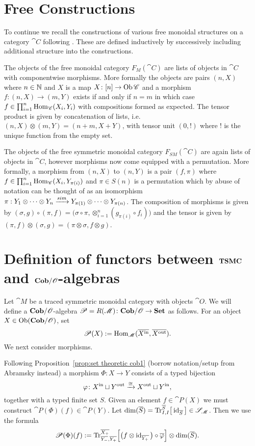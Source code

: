 \section{Free Constructions}

To continue we recall the constructions of various free monoidal structures on a category $\cat{C}$ following \cite{abramsky}.  These are defined inductively by successively including additional structure into the constructions.

The objects of the free monoidal category $F_M(\cat{C})$ are lists of objects in $\cat{C}$ with componentwise morphisms.  More formally the objects are pairs $(n,X)$ where $n\in\mathbb{N}$ and $X$ is a map $X\colon[n]\to \operatorname{Ob}\mathscr{C}$ and a morphism $f:(n,X)\to(m,Y)$ exists if and only if $n=m$ in which case $f\in\prod_{i=1}^n\operatorname{Hom}_{\mathscr{C}}(X_i,Y_i)$ with compositions formed as expected.  The tensor product is given by concatenation of lists, i.e. $(n,X)\otimes(m,Y)=(n+m,X+Y)$, with tensor unit $(0,!)$ where $!$ is the unique function from the empty set.

The objects of the free symmetric monoidal category $F_{SM}(\cat{C})$ are again lists of objects in $\cat{C}$, however morphisms now come equipped with a permutation.  More formally, a morphism from $(n,X)$ to $(n,Y)$ is a pair $(f,\pi)$ where $f\in\prod_{i=1}^n\operatorname{Hom}_{\mathscr{C}}(X_i,Y_{\pi(i)})$ and $\pi\in S(n)$ is a permutation which by abuse of notation can be thought of as an isomorphism $\pi:Y_1\otimes\cdots\otimes Y_n\xrightarrow{sim} Y_{\pi(1)}\otimes\cdots\otimes Y_{\pi(n)}$.  The composition of morphisms is given by $(\sigma,g)\circ(\pi,f)=\Big(\sigma\circ\pi,\otimes_{i=1}^n (g_{\pi(i)}\circ f_i)\Big)$ and the tensor is given by $(\pi,f)\otimes(\sigma,g)=(\pi\otimes\sigma,f\otimes g)$.  


\section{Definition of functors between $\mathbf{TSMC}$ and $\mathbf{Cob}/\mathscr{O}$-algebras}

Let $\cat{M}$ be a traced symmetric monoidal category with objects $\cat{O}$. We will define a $\mathbf{Cob}/\mathscr{O}$-algebra $\mathscr{P}=R(\mathscr{M})\colon\mathbf{Cob}/\mathscr{O}\to\mathbf{Set}$ as follows. For an object $X\in\operatorname{Ob}(\mathbf{Cob}/\mathscr{O})$, set 
$$\mathscr{P}(X):=\operatorname{Hom}_{\mathscr{M}}(\overline{X^{\text{in}}},\overline{X^{\text{out}}}).$$
We next consider morphisms.

Following Proposition~\ref{prop:set theoretic cob1} (borrow notation/setup from Abramsky instead) a morphism $\Phi\colon X\longrightarrow Y$ consists of a typed bijection 
$$\varphi\colon X^{\text{in}}\sqcup Y^{\text{out}}\xrightarrow{\cong}X^{\text{out}}\sqcup Y^{\text{in}},$$ 
together with a typed finite set $S$. Given an element $f\in\cat{P}(X)$ we must construct $\cat{P}(\Phi)(f)\in\cat{P}(Y)$. Let $\dim(\overline{S})=\textnormal{Tr}^{\overline{S}}_{I,I}\big[\operatorname{id}_{\overline{S}}\big]\in\mathscr{S}_{\mathscr{M}}$. Then we use the formula
$$\mathscr{P}(\Phi)(f):=
\textnormal{Tr}^{\overline{X_+}}_{\overline{Y_-},\overline{Y_+}}\Big[\big(f\otimes\operatorname{id}_{\overline{Y_+}}\big)\circ\overline{\varphi}\Big]
\otimes\dim(\overline{S}).	
$$


